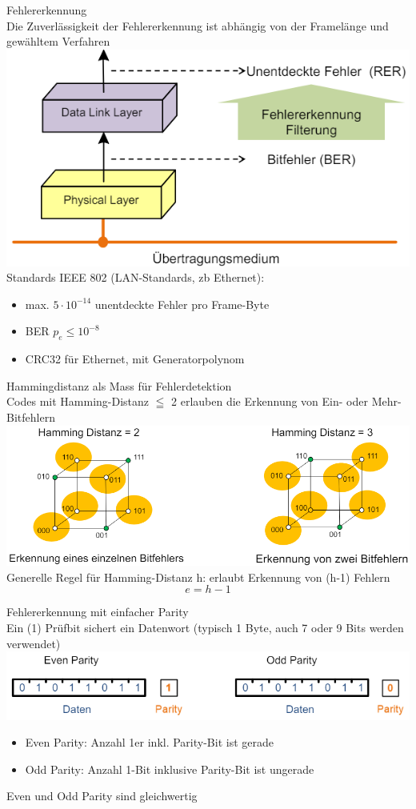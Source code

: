 \begin{concept}{Fehlererkennung}\\
    Die Zuverlässigkeit der Fehlererkennung ist abhängig von der Framelänge und gewähltem Verfahren\\
    \includegraphics[width=0.5\linewidth]{images/fehlererkennung.png}\\
    Standards IEEE 802 (LAN-Standards, zb Ethernet):
    \begin{itemize}
        \item max. $5 \cdot 10^{-14}$ unentdeckte Fehler pro Frame-Byte
        \item BER $p_e \leq 10^{-8}$
        \item CRC32 für Ethernet, mit Generatorpolynom
    \end{itemize}
\end{concept}



\begin{concept}{Hammingdistanz als Mass für Fehlerdetektion}\\
    Codes mit Hamming-Distanz $\leqq$ 2 erlauben die Erkennung von Ein- oder Mehr-Bitfehlern \\
        \includegraphics[width=0.8\linewidth]{images/hamming_distanz.png}\\
    Generelle Regel für Hamming-Distanz h: erlaubt Erkennung von (h-1) Fehlern 
    $$e = h - 1$$
\end{concept}

\begin{concept}{Fehlererkennung mit einfacher Parity}\\
    Ein (1) Prüfbit sichert ein Datenwort (typisch 1 Byte, auch 7 oder 9 Bits werden verwendet)\\
        \includegraphics[width=0.8\linewidth]{images/einfache_parity.png}
\begin{itemize}
    \item Even Parity: Anzahl 1er inkl. Parity-Bit ist gerade
    \item Odd Parity: Anzahl 1-Bit inklusive Parity-Bit ist ungerade
\end{itemize}
Even und Odd Parity sind gleichwertig
\end{concept}

